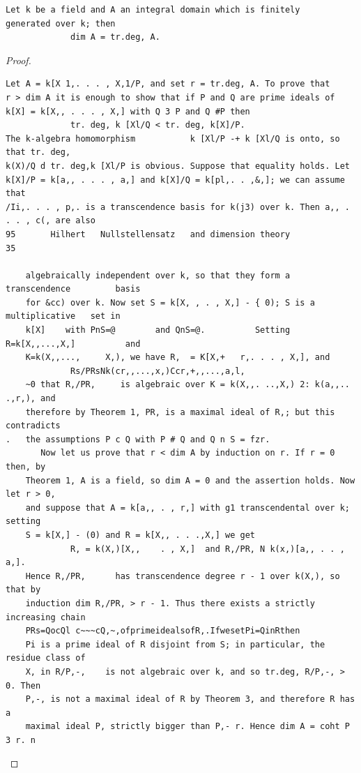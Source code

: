 \begin{theorem}\label{mcrt-auto-theorem-5-6}\uses{}
\begin{verbatim}
Let k be a field and A an integral domain which is finitely
generated over k; then
             dim A = tr.deg, A.
\end{verbatim}
\end{theorem}
\begin{proof}
\begin{verbatim}
Let A = k[X 1,. . . , X,1/P, and set r = tr.deg, A. To prove that
r > dim A it is enough to show that if P and Q are prime ideals of
k[X] = k[X,, . . . , X,] with Q 3 P and Q #P then
             tr. deg, k [Xl/Q < tr. deg, k[X]/P.
The k-algebra homomorphism           k [Xl/P -+ k [Xl/Q is onto, so that tr. deg,
k(X)/Q d tr. deg,k [Xl/P is obvious. Suppose that equality holds. Let
k[X]/P = k[a,, . . . , a,] and k[X]/Q = k[pl,. . ,&,]; we can assume that
/Ii,. . . , p,. is a transcendence basis for k(j3) over k. Then a,, . . . , c(, are also
95       Hilhert   Nullstellensatz   and dimension theory                      35

    algebraically independent over k, so that they form a transcendence         basis
    for &cc) over k. Now set S = k[X, , . , X,] - { 0); S is a multiplicative   set in
    k[X]    with PnS=@        and QnS=@.          Setting R=k[X,,...,X,]          and
    K=k(X,,...,     X,), we have R,  = K[X,+   r,. . . , X,], and
             Rs/PRsNk(cr,,...,x,)Ccr,+,,...,a,l,
    ~0 that R,/PR,     is algebraic over K = k(X,,. ..,X,) 2: k(a,,.. .,r,), and
    therefore by Theorem 1, PR, is a maximal ideal of R,; but this contradicts
.   the assumptions P c Q with P # Q and Q n S = fzr.
       Now let us prove that r < dim A by induction on r. If r = 0 then, by
    Theorem 1, A is a field, so dim A = 0 and the assertion holds. Now let r > 0,
    and suppose that A = k[a,, . , r,] with g1 transcendental over k; setting
    S = k[X,] - (0) and R = k[X,, . . .,X,] we get
             R, = k(X,)[X,,    . , X,]  and R,/PR, N k(x,)[a,, . . , a,].
    Hence R,/PR,      has transcendence degree r - 1 over k(X,), so that by
    induction dim R,/PR, > r - 1. Thus there exists a strictly increasing chain
    PRs=QocQl c~~~cQ,~,ofprimeidealsofR,.IfwesetPi=QinRthen
    Pi is a prime ideal of R disjoint from S; in particular, the residue class of
    X, in R/P,-,    is not algebraic over k, and so tr.deg, R/P,-, > 0. Then
    P,-, is not a maximal ideal of R by Theorem 3, and therefore R has a
    maximal ideal P, strictly bigger than P,- r. Hence dim A = coht P 3 r. n
\end{verbatim}
\end{proof}


